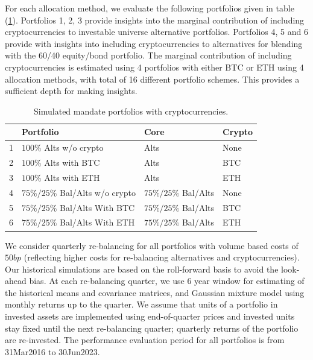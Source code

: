 \documentclass[pdftex,11pt,a4paper] {article}
\begin{document}
For each allocation method, we evaluate the following portfolios given in table (\ref{tab:portfolios}). Portfolios 1, 2, 3 provide insights into the marginal contribution of including cryptocurrencies to investable universe alternative portfolios. Portfolios 4, 5 and 6 provide with insights into including cryptocurrencies to alternatives for blending with the 60/40 equity/bond portfolio. The marginal contribution of including cryptocurrencies is estimated using 4 portfolios with either BTC or ETH using 4 allocation methods, with total of 16 different portfolio schemes. This provides a sufficient depth for making insights.

\begin{table}[H]
\centering
\small
\begin{tabular}{|l|l|l|l|}
\hline
 & Portfolio & Core & Crypto \\ \hline
1 & $100\%$ Alts w/o   crypto & Alts & None \\ \hline
2 & $100\%$ Alts with BTC & Alts & BTC \\ \hline
3 & $100\%$ Alts with ETH & Alts & ETH \\ \hline
4 & $75\%/25\%$ Bal/Alts w/o crypto & $75\%/25\%$ Bal/Alts & None \\ \hline
5 & $75\%/25\%$ Bal/Alts With BTC & $75\%/25\%$ Bal/Alts & BTC \\ \hline
6 & $75\%/25\%$ Bal/Alts  With ETH & $75\%/25\%$ Bal/Alts & ETH \\ \hline
\end{tabular}
\caption{Simulated mandate portfolios with cryptocurrencies.}
\label{tab:portfolios}\vspace*{-0.5\baselineskip}
\end{table}

We consider quarterly re-balancing for all portfolios with volume based costs of $50bp$ (reflecting higher costs for re-balancing alternatives and cryptocurrencies). Our historical simulations are based on the roll-forward basis to avoid the look-ahead bias. At each re-balancing quarter, we use 6 year window for estimating of the historical means and covariance matrices, and Gaussian mixture model using monthly returns up to the quarter. We assume that units of a portfolio in invested assets are implemented using end-of-quarter prices and invested units stay fixed until the next re-balancing quarter; quarterly returns of the portfolio are re-invested. The performance evaluation period for all portfolios is from 31Mar2016 to 30Jun2023.
\end{document}

